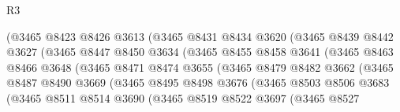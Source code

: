 \begin{lexlean}{R3}
\begin{coremodule}
                            (@3465
                              @8423
                              @8426
                              @3613
                              (@3465
                                @8431
                                @8434
                                @3620
                                (@3465
                                  @8439
                                  @8442
                                  @3627
                                  (@3465
                                    @8447
                                    @8450
                                    @3634
                                    (@3465
                                      @8455
                                      @8458
                                      @3641
                                      (@3465
                                        @8463
                                        @8466
                                        @3648
                                        (@3465
                                          @8471
                                          @8474
                                          @3655
                                          (@3465
                                            @8479
                                            @8482
                                            @3662
                                            (@3465
                                              @8487
                                              @8490
                                              @3669
                                              (@3465
                                                @8495
                                                @8498
                                                @3676
                                                (@3465
                                                  @8503
                                                  @8506
                                                  @3683
                                                  (@3465
                                                    @8511
                                                    @8514
                                                    @3690
                                                    (@3465
                                                      @8519
                                                      @8522
                                                      @3697
                                                      (@3465
                                                        @8527

\end{coremodule}
\end{lexlean}
